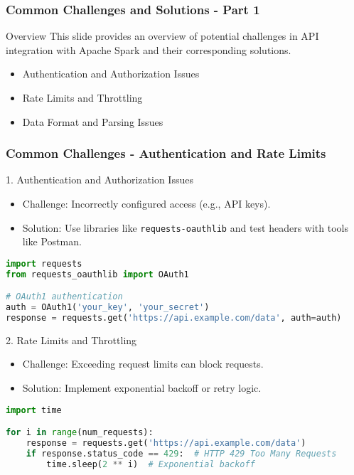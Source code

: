 \documentclass[aspectratio=169]{beamer}
\begin{document}
\begin{frame}[fragile]
    \frametitle{Common Challenges and Solutions - Part 1}
    \begin{block}{Overview}
        This slide provides an overview of potential challenges in API integration with Apache Spark and their corresponding solutions.
    \end{block}
    \begin{itemize}
        \item Authentication and Authorization Issues
        \item Rate Limits and Throttling
        \item Data Format and Parsing Issues
    \end{itemize}
\end{frame}

\begin{frame}[fragile]
    \frametitle{Common Challenges - Authentication and Rate Limits}
    \begin{block}{1. Authentication and Authorization Issues}
        \begin{itemize}
            \item Challenge: Incorrectly configured access (e.g., API keys).
            \item Solution: Use libraries like \texttt{requests-oauthlib} and test headers with tools like Postman.
        \end{itemize}
        \begin{lstlisting}[language=Python]
import requests
from requests_oauthlib import OAuth1

# OAuth1 authentication
auth = OAuth1('your_key', 'your_secret')
response = requests.get('https://api.example.com/data', auth=auth)
        \end{lstlisting}
    \end{block}

    \begin{block}{2. Rate Limits and Throttling}
        \begin{itemize}
            \item Challenge: Exceeding request limits can block requests.
            \item Solution: Implement exponential backoff or retry logic.
        \end{itemize}
        \begin{lstlisting}[language=Python]
import time

for i in range(num_requests):
    response = requests.get('https://api.example.com/data')
    if response.status_code == 429:  # HTTP 429 Too Many Requests
        time.sleep(2 ** i)  # Exponential backoff
        \end{lstlisting}
    \end{block}
\end{frame}
\end{document}
